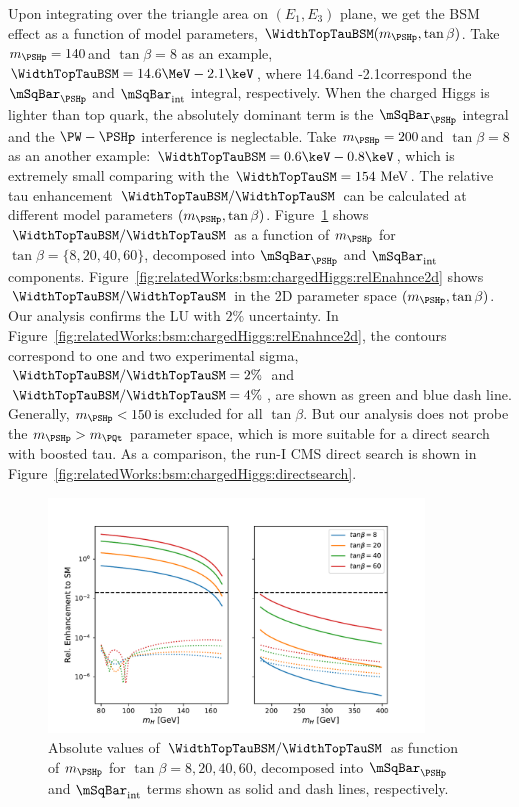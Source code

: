\noindent Upon integrating over the triangle area on  $(E_1, E_3)$ plane, we get the BSM effect as a function of model parameters, $\WidthTopTauBSM (m_{\PSHp}, \tan\beta)$. Take $m_{\PSHp} = 140 $\GeV and $\tan\beta=8$ as an example, $\WidthTopTauBSM= 14.6 \MeV - 2.1 \keV$, where 14.6\MeV and  -2.1\keV correspond the  $\mSqBar _{\PSHp}$ and $\mSqBar _{\mathrm{int}}$ integral, respectively. When the charged Higgs is  lighter than top quark, the absolutely dominant term is the $\mSqBar _{\PSHp}$ integral and the $\PW-\PSHp$ interference is neglectable. Take $m_{\PSHp} = 200 $\GeV and $\tan\beta=8$ as an another example: $\WidthTopTauBSM = 0.6 \keV - 0.8 \keV$, which is extremely small comparing with the $\WidthTopTauSM= 154 \text{ MeV}$. The relative tau enhancement $\WidthTopTauBSM/\WidthTopTauSM$ can be calculated at different model parameters $(m_{\PSHp}, \tan\beta)$. Figure~\ref{fig:relatedWorks:bsm:chargedHiggs:relEnhance1d} shows  $\WidthTopTauBSM/\WidthTopTauSM$ as a function of $m_{\PSHp}$ for $\tan\beta= \{8,20,40,60\}$, decomposed into $\mSqBar _{\PSHp}$ and $\mSqBar _{\mathrm{int}}$  components. Figure~\ref{fig:relatedWorks:bsm:chargedHiggs:relEnahnce2d} shows $\WidthTopTauBSM/\WidthTopTauSM$ in the 2D parameter space $(m_{\PSHp}, \tan\beta)$. Our analysis confirms the LU with $2\%$ uncertainty. In  Figure~\ref{fig:relatedWorks:bsm:chargedHiggs:relEnahnce2d}, the contours correspond to one and two experimental sigma, $\WidthTopTauBSM/\WidthTopTauSM = 2\%$ and $\WidthTopTauBSM/\WidthTopTauSM = 4\%$, are shown as green and blue dash line. Generally, $m_{\PSHp} < 150$\GeV is excluded for all $\tan\beta$. But our analysis does not probe the $m_{\PSHp} >m_\PQt$ parameter space, which is more suitable for a direct search with boosted tau. As a comparison, the run-I CMS direct search \cite{Khachatryan:2015qxa} is shown in Figure~\ref{fig:relatedWorks:bsm:chargedHiggs:directsearch}.


\begin{figure}[ht]
    \centering
    \includegraphics[width=0.89\textwidth]{chapters/RelatedWorks/sectionBSM/figures/RelEnhance2HDM_1d.pdf}
    \caption{ Absolute values of $\WidthTopTauBSM/\WidthTopTauSM$ as function of $m_{\PSHp}$ for $\tan\beta= 8,20,40,60$, decomposed into $\mSqBar _{\PSHp}$ and $\mSqBar _{\mathrm{int}}$  terms shown as solid and dash lines, respectively. }
    \label{fig:relatedWorks:bsm:chargedHiggs:relEnhance1d}
\end{figure}







